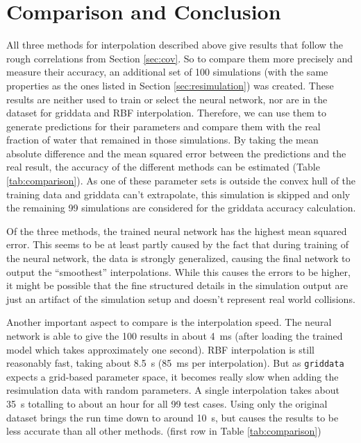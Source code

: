 \chapter{Comparison and Conclusion}
\label{sec:comparison}

All three methods for interpolation described above give results that follow the rough correlations from Section \ref{sec:cov}. So to compare them more precisely and measure their accuracy, an additional set of 100 simulations (with the same properties as the ones listed in Section \ref{sec:resimulation}) was created. These results are neither used to train or select the neural network, nor are in the dataset for griddata and RBF interpolation. Therefore, we can use them to generate predictions for their parameters and compare them with the real fraction of water that remained in those simulations. By taking the mean absolute difference and the mean squared error between the predictions and the real result, the accuracy of the different methods can be estimated (Table \ref{tab:comparison}). As one of these parameter sets is outside the convex hull of the training data and griddata can't extrapolate, this simulation is skipped and only the remaining 99 simulations are considered for the griddata accuracy calculation. 

Of the three methods, the trained neural network has the highest mean squared error. This seems to be at least partly caused by the fact that during training of the neural network, the data is strongly generalized, causing the final network to output the \enquote{smoothest} interpolations. While this causes the errors to be higher, it might be possible that the fine structured details in the simulation output are just an artifact of the simulation setup and doesn't represent real world collisions.


Another important aspect to compare is the interpolation speed. The neural network is able to give the 100 results in about \SI{4}{\milli\second} (after loading the trained model which takes approximately one second). RBF interpolation is still reasonably fast, taking about \SI{8.5}{\second} (\SI{85}{\milli\second} per interpolation). But as \texttt{griddata} expects a grid-based parameter space, it becomes really slow when adding the resimulation data with random parameters. A single interpolation takes about \SI{35}{\second} totalling to about an hour for all 99 test cases. Using only the original dataset brings the run time down to around \SI{10}{\second}, but causes the results to be less accurate than all other methods. (first row in Table \ref{tab:comparison})

